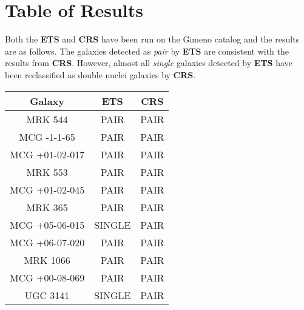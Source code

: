 \documentclass[12pt]{article}
\begin{document}
\section{Table of Results}

Both the \textbf{ETS} and \textbf{CRS} have been run on the Gimeno catalog and the results are as follows. The galaxies detected as \textit{pair} by \textbf{ETS} are consistent with the results from \textbf{CRS}. However, almost all \textit{single} galaxies detected by \textbf{ETS} have been reclassified as double nuclei galaxies by \textbf{CRS}. 

\begin{table}[!b]
\parbox{.45\linewidth}{
\centering
\begin{tabular}{|c|c|c|}
\hline
\textbf{Galaxy} & \textbf{ETS} & \textbf{CRS} \\
\hline
MRK 544        & PAIR             & PAIR             \\
MCG -1-1-65    & PAIR             & PAIR             \\
MCG +01-02-017 & PAIR             & PAIR             \\
MRK 553        & PAIR             & PAIR             \\
MCG +01-02-045 & PAIR             & PAIR             \\
MRK 365        & PAIR             & PAIR             \\
MCG +05-06-015 & SINGLE           & PAIR             \\
MCG +06-07-020 & PAIR             & PAIR             \\
MRK 1066       & PAIR             & PAIR             \\
MCG +00-08-069 & PAIR             & PAIR             \\
UGC 3141       & SINGLE           & PAIR             \\


\end{tabular}}
\end{table}
\end{document}
